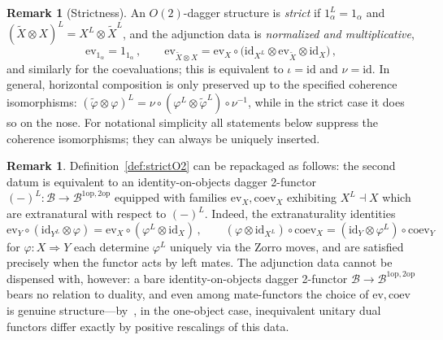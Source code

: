\documentclass[11pt]{article}
\theoremstyle{definition}
\newtheorem{remark}[theorem]{Remark}
\newcommand{\cB}{\mathcal{B}}
\newcommand{\op}{\mathrm{op}}
\newcommand{\Or}{O} %
\begin{document}
\begin{remark}[Strictness]
\label{rem:strictcase}
An $\Or(2)$-dagger structure is \emph{strict} if $1_\alpha^L = 1_\alpha$ and $(\widetilde{X} \otimes X)^L = X^L \otimes \widetilde{X}^L$, and the adjunction data is \emph{normalized and multiplicative},
\begin{equation}
\label{eq:multiplicativity}
  \mathrm{ev}_{1_\alpha} = 1_{1_\alpha} \, ,
  \qquad
  \mathrm{ev}_{\widetilde{X} \otimes X} = \mathrm{ev}_X \circ \big(\mathrm{id}_{X^L} \otimes \mathrm{ev}_{\widetilde{X}} \otimes \mathrm{id}_X\big) \, ,
\end{equation}
and similarly for the coevaluations; this is equivalent to $\iota = \mathrm{id}$ and $\nu = \mathrm{id}$. In general, horizontal composition is only preserved up to the specified coherence isomorphisms: $(\widetilde{\varphi} \otimes \varphi)^L = \nu \circ (\varphi^L \otimes \widetilde{\varphi}^L) \circ \nu^{-1}$, while in the strict case it does so on the nose. For notational simplicity all statements below suppress the coherence isomorphisms; they can always be uniquely inserted.
\end{remark}

\begin{remark}
\label{rem:repackaging}
Definition~\ref{def:strictO2} can be repackaged as follows: the second datum is equivalent to an identity-on-objects dagger 2-functor $(-)^L \colon \cB \to \cB^{1\op,2\op}$ equipped with families $\mathrm{ev}_X, \mathrm{coev}_X$ exhibiting $X^L \dashv X$ which are extranatural with respect to $(-)^L$. Indeed, the extranaturality identities
\begin{equation}
  \mathrm{ev}_Y \circ (\mathrm{id}_{Y^L} \otimes \varphi) = \mathrm{ev}_X \circ (\varphi^L \otimes \mathrm{id}_X) \, ,
  \qquad
  (\varphi \otimes \mathrm{id}_{X^L}) \circ \mathrm{coev}_X = (\mathrm{id}_Y \otimes \varphi^L) \circ \mathrm{coev}_Y
\end{equation}
for $\varphi \colon X \Rightarrow Y$ each determine $\varphi^L$ uniquely via the Zorro moves, and are satisfied precisely when the functor acts by left mates. The adjunction data cannot be dispensed with, however: a bare identity-on-objects dagger 2-functor $\cB \to \cB^{1\op,2\op}$ bears no relation to duality, and even among mate-functors the choice of $\mathrm{ev}, \mathrm{coev}$ is genuine structure---by~\cite{Pen20}, in the one-object case, inequivalent unitary dual functors differ exactly by positive rescalings of this data.
\end{remark}
\end{document}
